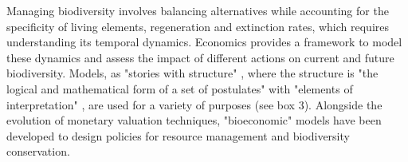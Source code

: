 
Managing biodiversity involves balancing alternatives while accounting for the specificity of living elements, regeneration and extinction rates, which requires understanding its temporal dynamics. Economics provides a framework to model these dynamics and assess the impact of different actions on current and future biodiversity. Models, as "stories with structure" \citep{GibbardVarian}, where the structure is "the logical and mathematical form of a set of postulates" with "elements of interpretation" \citep{GibbardVarian}, are used for a variety of purposes (see box 3).
Alongside the evolution of monetary valuation techniques, "bioeconomic" models have been developed to design policies for resource management and biodiversity conservation.\\

\clearpage

